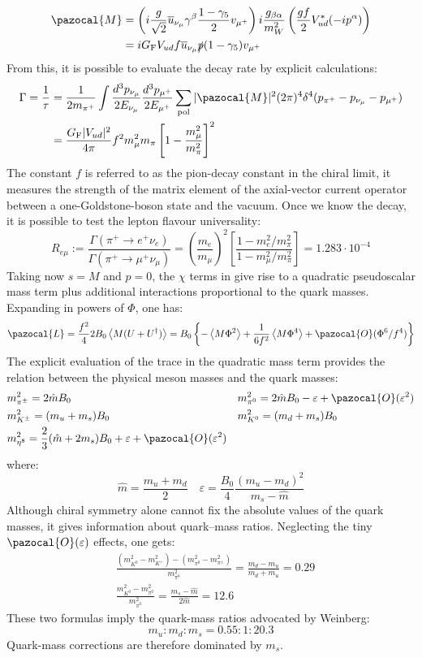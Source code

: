 \documentclass[../main.tex]{subfiles}
\begin{document}
\begin{align*}
\pazocal{M}&=\left(i\frac{g}{\sqrt{2}}\overline{u}_{\nu_\mu}\gamma^\beta\frac{1-\gamma_5}{2}v_{\mu^+}\right)i\frac{g_{\beta\alpha}}{m_W^2}\left(\frac{gf}{2}V_{ud}^*(-ip^\alpha)\right)\\
&=iG_{\text{F}}V_{ud}f\overline{u}_{\nu_\mu}\slashed{p}(1-\gamma_5)v_{\mu^+}
\end{align*}
From this, it is possible to evaluate the decay rate by explicit calculations:
\begin{align*}
\Gamma=\frac{1}{\tau}&=\frac{1}{2m_{\pi^+}}\int\frac{d^3p_{\nu_\mu}}{2E_{\nu_\mu}}\frac{d^3p_{\mu^+}}{2E_{\mu^+}}\sum_{\text{pol}}|\pazocal{M}|^2(2\pi)^4\delta^4(p_{\pi^+}-p_{\nu_\mu}-p_{\mu^+})\\
&=\frac{G_{\text{F}}|V_{ud}|^2}{4\pi}f^2m_\mu^2m_\pi\left[1-\frac{m_\mu^2}{m_\pi^2}\right]^2
\end{align*}
The constant $f$ is referred to as the pion-decay constant in the chiral limit, it measures the strength of the matrix element of the axial-vector current
operator between a one-Goldstone-boson state and the vacuum. Once we know the decay, it is possible to test the lepton flavour universality:
\[
R_{e\mu}:=\frac{\Gamma(\pi^+\to e^+\nu_e)}{\Gamma(\pi^+\to\mu^+\nu_\mu)}=\left(\frac{m_e}{m_\mu}\right)^2\left[\frac{1-m_e^2/m_\pi^2}{1-m_\mu^2/m_\pi^2}\right]=1.283\cdot10^{-4}
\]
Taking now $s=M$ and $p=0$, the $\chi$ terms in  give rise to a
quadratic pseudoscalar mass term plus additional interactions proportional to the quark masses. Expanding in powers of $\Phi$, one has:
\[
\pazocal{L}=\frac{f^2}{4}2B_0\Braket{M(U+U^\dagger)}=B_0\left\{-\Braket{M\Phi^2}+\frac{1}{6f^2}\Braket{M\Phi^4}+\pazocal{O}(\Phi^6/f^4)\right\}
\]
The explicit evaluation of the trace in the quadratic mass term provides the relation between the physical meson masses and the quark masses:
\[
\begin{aligned}
&m_{\pi^\pm}^2=2\hat{m}B_0 &&m_{\pi^0}^2=2\hat{m}B_0-\varepsilon+\pazocal{O}(\varepsilon^2)\\
&m_{K^\pm}^2=(m_u+m_s)B_0 &&m_{K^0}^2=(m_d+m_s)B_0\\
&m_{\eta^8}^2=\frac{2}{3}(\hat{m}+2m_s)B_0+\varepsilon+\pazocal{O}(\varepsilon^2)
\end{aligned}
\]
where:
\[
\hat{m}=\frac{m_u+m_d}{2} \quad \varepsilon=\frac{B_0}{4}\frac{(m_u-m_d)^2}{m_s-\hat{m}}
\]
Although chiral symmetry alone cannot fix the absolute values of the
quark masses, it gives information about quark–mass ratios. Neglecting
the tiny $\pazocal{O}(\varepsilon)$ effects, one gets:
\[
\begin{aligned}
&\frac{(m_{K^0}^2-m_{K^+}^2)-(m_{\pi^0}^2-m_{\pi^\pm}^2)}{m_{\pi^0}^2}=\frac{m_d-m_u}{m_d+m_u}=0.29\\
&\frac{m_{K^0}^2-m_{\pi^0}^2}{m_{\pi^0}^2}=\frac{m_s-\hat{m}}{2\hat{m}}=12.6
\end{aligned}
\]
These two formulas imply the quark-mass ratios advocated by Weinberg:
\[
m_u:m_d:m_s=0.55:1:20.3
\]
Quark-mass corrections are therefore dominated by $m_s$.
\end{document}

